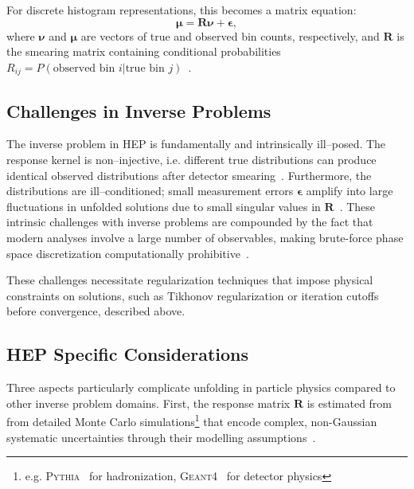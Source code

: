 For discrete histogram representations, this becomes a matrix equation:
\begin{equation}
    \label{eq:forward-binned}
    \boldsymbol{\mu} = \mathbf{R}\boldsymbol{\nu} + \boldsymbol{\epsilon},
\end{equation}
where \(\boldsymbol{\nu}\) and \(\boldsymbol{\mu}\) are vectors of true and observed bin counts, respectively, and \(\mathbf{R}\) is the smearing matrix containing conditional probabilities \(R_{ij} = P(\text{observed bin } i | \text{true bin } j)\)~\cite{cms_collaboration_measurement_2011}.

    \subsection{Challenges in Inverse Problems}
        The inverse problem in HEP is fundamentally and intrinsically ill--posed.
        The response kernel is non--injective, i.e. different true distributions can produce identical observed distributions after detector smearing~\cite{palumbo_convergence_2025, neumaier_solving_1998}.
        Furthermore, the distributions are ill--conditioned; small measurement errors \(\boldsymbol{\epsilon}\) amplify into large fluctuations in unfolded solutions due to small singular values in \(\mathbf{R}\)~\cite{ChungA, fernandez-martinez_effect_2014, carpio_inverse_2008}.
        These intrinsic challenges with inverse problems are compounded by the fact that modern analyses involve a large number of observables, making brute-force phase space discretization computationally prohibitive~\cite{arratia_optimizing_2022, gaponenko_practical_2020, chan_unbinned_2023}.

        These challenges necessitate regularization techniques that impose physical constraints on solutions, such as Tikhonov regularization or iteration cutoffs before convergence, described above.

    \subsection{HEP Specific Considerations}
        Three aspects particularly complicate unfolding in particle physics compared to other inverse problem domains.
        First, the response matrix $\mathbf{R}$ is estimated from from detailed Monte Carlo simulations\footnote{e.g. \textsc{Pythia}~\cite{bierlich_comprehensive_2022} for hadronization, \textsc{Geant4}~\cite{allison_recent_2016} for detector physics} that encode complex, non-Gaussian systematic uncertainties through their modelling assumptions~\cite{bozson_unfolding_2018, schmitt_data_2017, blobel_unfolding_2011, Huang2025MachineTechnique}.

